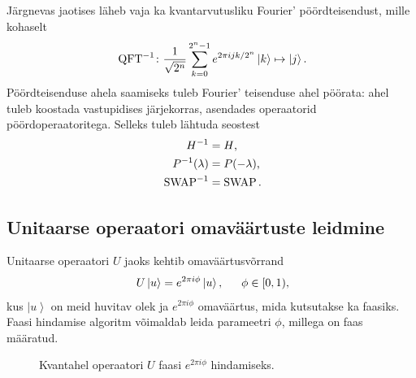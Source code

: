 \documentclass[12pt]{report}
\def\ket#1{\left|#1\right>}
\def\SWAP{\mathop{\rm SWAP}\nolimits}
\def\QFT{\mathop{\rm QFT}\nolimits}
\begin{document}
Järgnevas jaotises läheb vaja ka kvantarvutusliku Fourier' pöördteisendust, mille kohaselt
\begin{align}\label{eq:iqftdef}
    \QFT^{-1}\colon
    \frac{1}{\sqrt{2^n}} \sum_{k=0}^{2^n-1} e^{2\pi ijk/2^n} \ket{k} \mapsto \ket{j} \rlap{.}
\end{align}
Pöördteisenduse ahela saamiseks tuleb Fourier' teisenduse ahel pöörata: ahel tuleb koostada vastupidises järjekorras, asendades operaatorid pöördoperaatoritega.
Selleks tuleb lähtuda seostest
\begin{align}
    H^{-1} &= H \rlap{,} \\
    P^{-1}(\lambda) &= P(-\lambda) \rlap{,} \\
    \SWAP^{-1} &= \SWAP \rlap{.}
\end{align}

\subsection{Unitaarse operaatori omaväärtuste leidmine}\label{sec:unit}

Unitaarse operaatori \(U\) jaoks kehtib omaväärtusvõrrand
\begin{align}\label{eq:uniteigen}
    U\ket{u} = e^{2\pi i\phi}\ket{u} \rlap{,}
    \qquad \phi \in [0,1) \rlap{,}
\end{align}
kus \(\ket{u}\) on meid huvitav olek ja \(e^{2\pi i\phi}\) omaväärtus, mida kutsutakse ka faasiks.
Faasi hindamise algoritm võimaldab leida parameetri \(\phi\), millega on faas määratud.

\begin{figure}[h]
    \centering
    \ifdefined\yquanton
    \fi
    \caption{Kvantahel operaatori \(U\) faasi \(e^{2\pi i\phi}\) hindamiseks.}
    \label{fig:pea}
\end{figure}
\end{document}
